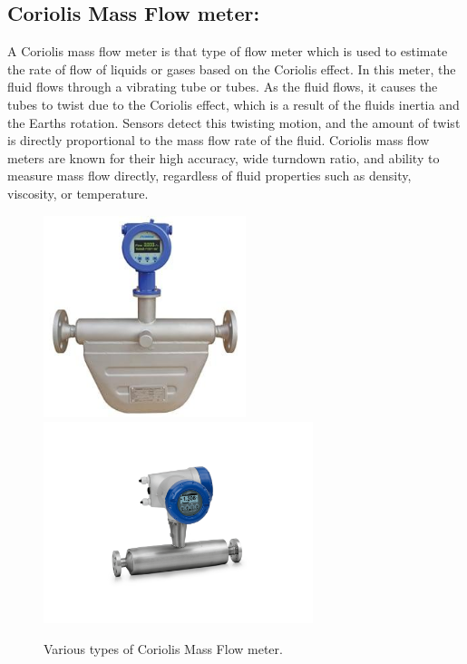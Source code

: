 \subsection{Coriolis Mass Flow meter:}

A Coriolis mass flow meter is that type of flow meter which is used to
estimate the rate of flow of liquids or gases based on the Coriolis
effect. In this meter, the fluid flows through a vibrating tube or
tubes. As the fluid flows, it causes the tubes to twist due to the
Coriolis effect, which is a result of the fluid\textquotesingle s
inertia and the Earth\textquotesingle s rotation. Sensors detect this
twisting motion, and the amount of twist is directly proportional to the
mass flow rate of the fluid. Coriolis mass flow meters are known for
their high accuracy, wide turndown ratio, and ability to measure mass
flow directly, regardless of fluid properties such as density,
viscosity, or temperature.


\begin{figure}[h!]
    \centering
    \includegraphics[width=2.31944in,height=2.31944in]{figs/flowmeters/image11.jpg}\includegraphics[width=3.09375in,height=2.31944in]{figs/flowmeters/image12.png}
    \caption{Various types of Coriolis Mass Flow meter.}
    \label{fig:Various types of Coriolis Mass Flow meter.}
\end{figure}

